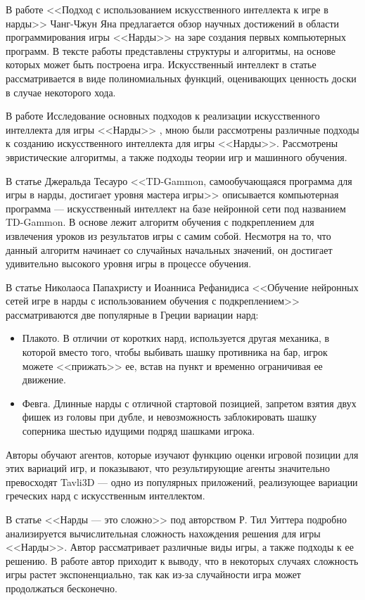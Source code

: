 В работе <<Подход с использованием искусственного интеллекта к игре в нарды>> Чанг-Чжун Яна \cite{firstattempts} предлагается обзор научных достижений в области программирования игры <<Нарды>> на заре создания первых компьютерных программ. В тексте работы представлены структуры и алгоритмы, на основе которых может быть построена игра. Искусственный интеллект в статье рассматривается в виде полиномиальных функций, оценивающих ценность доски в случае некоторого хода.

В работе Исследование основных подходов к реализации искусственного интеллекта для игры <<Нарды>> \cite{myfirstwork}, мною были рассмотрены различные подходы к созданию искусственного интеллекта для игры <<Нарды>>. Рассмотрены эвристические алгоритмы, а также подходы теории игр и машинного обучения.

В статье Джеральда Тесауро <<TD-Gammon, самообучающаяся программа для игры в нарды, достигает уровня мастера игры>> \cite{annotationtdgammon} описывается компьютерная программа --- искусственный интеллект на базе нейронной сети под названием TD-Gammon. В основе лежит алгоритм обучения с подкреплением для извлечения уроков из результатов игры с самим собой. Несмотря на то, что данный алгоритм начинает со случайных начальных значений, он достигает удивительно высокого уровня игры в процессе обучения.

В статье Николаоса Папахристу и Иоанниса Рефанидиса <<Обучение нейронных сетей игре в нарды с использованием обучения с подкреплением>> \cite{annotationavli3d} рассматриваются две популярные в Греции вариации нард:
\begin{itemize}
    \item Плакото. В отличии от коротких нард, используется другая механика, в которой вместо того, чтобы выбивать шашку противника на бар, игрок можете <<прижать>> ее, встав на пункт и временно ограничивая ее движение.
    \item Февга. Длинные нарды с отличной стартовой позицией, запретом взятия двух фишек из головы при дубле, и невозможность заблокировать шашку соперника шестью идущими подряд шашками игрока.
\end{itemize}

Авторы обучают агентов, которые изучают функцию оценки игровой позиции для этих вариаций игр, и показывают, что результирующие агенты значительно превосходят Tavli3D --- одно из популярных приложений, реализующее вариации греческих нард с искусственным интеллектом.

В статье <<Нарды --- это сложно>> под авторством Р. Тил Уиттера \cite{backgammonishard} подробно анализируется вычислительная сложность нахождения решения для игры <<Нарды>>. Автор рассматривает различные виды игры, а также подходы к ее решению. В работе автор приходит к выводу, что в некоторых случаях сложность игры растет экспоненциально, так как из-за случайности игра может продолжаться бесконечно.
